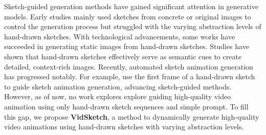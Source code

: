 Sketch-guided generation methods have gained significant attention in generative models. Early studies \cite{chen2023control,ye2023ip} mainly used sketches from concrete or original images to control the generation process but struggled with the varying abstraction levels of hand-drawn sketches. With technological advancements, some works have succeeded in generating static images from hand-drawn sketches. Studies \cite{voynov2023sketch,koley2024s} have shown that hand-drawn sketches effectively serve as semantic cues to create detailed, context-rich images. Recently, automated sketch animation generation has progressed notably. For example, \cite{gal2024breathing,bandyopadhyay2024flipsketch} use the first frame of a hand-drawn sketch to guide sketch animation generation, advancing sketch-guided methods. However, as of now, no work explores explore guiding high-quality video animation using only hand-drawn sketch sequences and simple prompt. To fill this gap, we propose \textbf{VidSketch}, a method to dynamically generate high-quality video animations using hand-drawn sketches with varying abstraction levels.